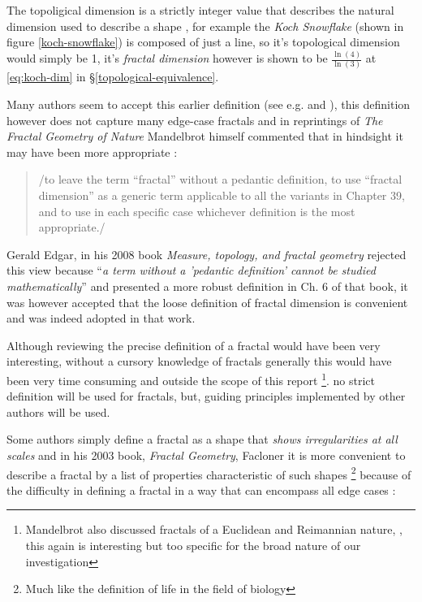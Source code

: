 \documentclass[11pt]{article}
\begin{document}
The topoligical dimension is a strictly integer value that describes the natural dimension used to describe a shape \cite{sandersonFractalsAreTypically2017},
for example the \emph{Koch Snowflake} (shown in figure \ref{koch-snowflake}) is composed of
just a line, so it's topological dimension would simply be 1, it's \emph{fractal
dimension} however is shown to be \(\frac{\ln\left( 4 \right)}{\ln\left( 3
\right)}\) at \eqref{eq:koch-dim} in \S\ref{topological-equivalence}.

Many authors seem to accept this earlier definition (see e.g. \cite[\S2.2]{vicsekFractalGrowthPhenomena1992} and \cite[\S2.1]{telChaoticDynamicsIntroduction2006}),
this definition however does not capture many edge-case fractals
 \cite[VII]{edgarMeasureTopologyFractal2008a} and in reprintings of \emph{The
Fractal Geometry of Nature} Mandelbrot himself commented that in hindsight it
may have been more appropriate \cite[p. 459]{mandelbrotFractalGeometryNature1982}:

\begin{quote}
/to leave the term ``fractal” without a pedantic definition, to use “fractal
dimension” as a generic term applicable to all the variants in Chapter 39, and
to use in each specific case whichever definition is the most appropriate./
\end{quote}

Gerald Edgar, in his 2008 book \emph{Measure, topology, and fractal geometry}
rejected this view because ``\emph{a term without a 'pedantic definition' cannot be
studied mathematically}'' \cite[VII]{edgarMeasureTopologyFractal2008a} and
presented a more robust definition in Ch. 6 of that book, it was however
accepted that the loose definition of fractal dimension is convenient and was
indeed adopted in that work.

Although reviewing the precise definition of a fractal would have been very
interesting, without a cursory knowledge of fractals generally this would have
been very time consuming and outside the scope of this report \footnote{Mandelbrot
also discussed fractals of a Euclidean and Reimannian nature,
\cite[p. 361]{mandelbrotFractalGeometryNature1982}, this again is interesting
but too specific for the broad nature of our investigation}. no strict
definition will be used for fractals, but, guiding principles implemented by
other authors will be used.

Some authors simply define a fractal as a shape that \emph{shows irregularities at all scales} \cite[p. 1]{gouyetPhysicsFractalStructures1996} and
in his 2003 book, \emph{Fractal Geometry}, Facloner  it is more convenient to describe a fractal by a list of properties characteristic of such shapes \footnote{Much like the definition of life in the field of biology} because of the difficulty in defining a fractal in a way that can encompass all edge cases \cite[p. xxv]{falconerFractalGeometryMathematical2003b}:
\end{document}

